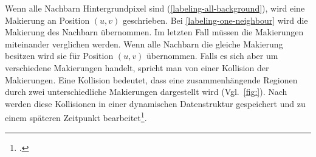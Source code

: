 Wenn alle Nachbarn Hintergrundpixel sind (\autoref{labeling-all-background}), wird eine Makierung an Position $(u,v)$
 geschrieben. Bei \autoref{labeling-one-neighbour} wird die Makierung des Nachbarn übernommen. Im letzten Fall müssen
 die Makierungen miteinander verglichen werden. Wenn alle Nachbarn die gleiche Makierung besitzen wird sie für Position
 $(u,v)$ übernommen. Falls es sich aber um verschiedene Makierungen handelt, spricht man von einer Kollision der
 Makierungen. Eine Kollision bedeutet, dass eine zusammenhängende Regionen durch zwei unterschiedliche Makierungen
 dargestellt wird (Vgl.~\autoref{fig:}). Nach \citeauthor{burger05} werden diese Kollisionen in einer dynamischen
 Datenstruktur gespeichert und zu einem späteren Zeitpunkt bearbeitet\footcite[Vgl.][S.~203--204]{burger05}.




